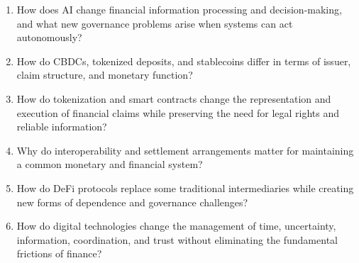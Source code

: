 

\begin{enumerate}

\item How does AI change financial information processing and decision-making, and what new governance problems arise when systems can act autonomously?

\item How do CBDCs, tokenized deposits, and stablecoins differ in terms of issuer, claim structure, and monetary function?

\item How do tokenization and smart contracts change the representation and execution of financial claims while preserving the need for legal rights and reliable information?

\item Why do interoperability and settlement arrangements matter for maintaining a common monetary and financial system?

\item How do DeFi protocols replace some traditional intermediaries while creating new forms of dependence and governance challenges?

\item How do digital technologies change the management of time, uncertainty, information, coordination, and trust without eliminating the fundamental frictions of finance?

\end{enumerate}





